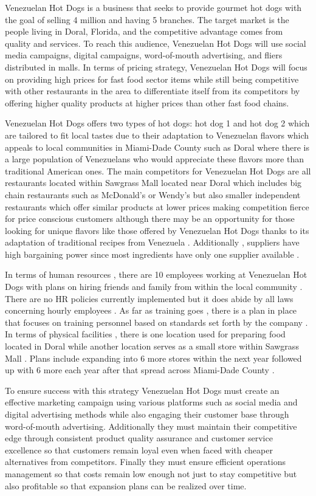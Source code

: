 

Venezuelan Hot Dogs is a business that seeks to provide gourmet hot dogs with the goal of selling 4 million and having 5 branches. The target market is the people living in Doral, Florida, and the competitive advantage comes from quality and services. To reach this audience, Venezuelan Hot Dogs will use social media campaigns, digital campaigns, word-of-mouth advertising, and fliers distributed in malls. In terms of pricing strategy, Venezuelan Hot Dogs will focus on providing high prices for fast food sector items while still being competitive with other restaurants in the area to differentiate itself from its competitors by offering higher quality products at higher prices than other fast food chains. 

Venezuelan Hot Dogs offers two types of hot dogs: hot dog 1 and hot dog 2 which are tailored to fit local tastes due to their adaptation to Venezuelan flavors which appeals to local communities in Miami-Dade County such as Doral where there is a large population of Venezuelans who would appreciate these flavors more than traditional American ones. The main competitors for Venezuelan Hot Dogs are all restaurants located within Sawgrass Mall located near Doral which includes big chain restaurants such as McDonald's or Wendy's but also smaller independent restaurants which offer similar products at lower prices making competition fierce for price conscious customers although there may be an opportunity for those looking for unique flavors like those offered by Venezuelan Hot Dogs thanks to its adaptation of traditional recipes from Venezuela . Additionally , suppliers have high bargaining power since most ingredients have only one supplier available . 

In terms of human resources , there are 10 employees working at Venezuelan Hot Dogs with plans on hiring friends and family from within the local community . There are no HR policies currently implemented but it does abide by all laws concerning hourly employees . As far as training goes , there is a plan in place that focuses on training personnel based on standards set forth by the company .  In terms of physical facilities , there is one location used for preparing food located in Doral while another location serves as a small store within Sawgrass Mall . Plans include expanding into 6 more stores within the next year followed up with 6 more each year after that spread across Miami-Dade County . 

To ensure success with this strategy Venezuelan Hot Dogs must create an effective marketing campaign using various platforms such as social media and digital advertising methods while also engaging their customer base through word-of-mouth advertising. Additionally they must maintain their competitive edge through consistent product quality assurance and customer service excellence so that customers remain loyal even when faced with cheaper alternatives from competitors. Finally they must ensure efficient operations management so that costs remain low enough not just to stay competitive but also profitable so that expansion plans can be realized over time.